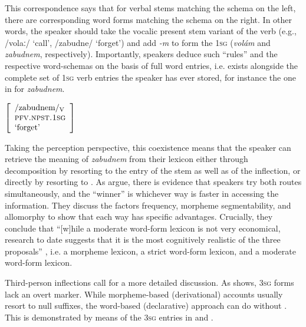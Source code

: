 \documentclass[output=paper,colorlinks,citecolor=brown,
]{langscibook}
\begin{document}
\bigskip

\noindent This correspondence says that for verbal stems matching the schema on the left, there are corresponding word forms matching the schema on the right. In other words, the speaker should take the vocalic present stem variant of the verb (e.g., /volaː/ `call', /zabudne/ `forget') and add \textit{-m} to form the \textsc{1sg} (\textit{volám} and \textit{zabudnem}, respectively). Importantly, speakers deduce such ``rules'' and the respective word-schemas on the basis of full word entries, i.e.  exists alongside the complete set of \textsc{1sg} verb entries the speaker has ever stored, for instance the one in  for \textit{zabudnem}.

\ea\label{ex:zabudnem}
$\left[
\begin{array}{l}
    \text{/zabudnem/\textsubscript{V}} \\
    \textsc{pfv.npst.1sg} \\
    \text{`forget'}
\end{array}
\right] $
\z

\noindent Taking the perception perspective, this coexistence means that the speaker can retrieve the meaning of \textit{zabudnem} from their lexicon either through decomposition by resorting to the entry of the stem as well as of the inflection, or directly by resorting to . As \citet[72]{HaspelmathSims2010} argue, there is evidence that speakers try both routes simultaneously, and the ``winner'' is whichever way is faster in accessing the information. They discuss the factors frequency, morpheme segmentability, and allomorphy to show that each way has specific advantages. Crucially, they conclude that ``[w]hile a moderate word-form lexicon is not very economical, research to date suggests that it is the most cognitively realistic of the three proposals'' \citep[74]{HaspelmathSims2010}, i.e. a morpheme lexicon, a strict word-form lexicon, and a moderate word-form lexicon.

Third-person inflections call for a more detailed discussion. As  shows, \textsc{3sg} forms lack an overt marker. While morpheme-based (derivational) accounts usually resort to null suffixes, the word-based (declarative) approach can do without \citep[see][470]{Jackendoff.Audring2016}. This is demonstrated by means of the \textsc{3sg} entries in  and .
\end{document}
